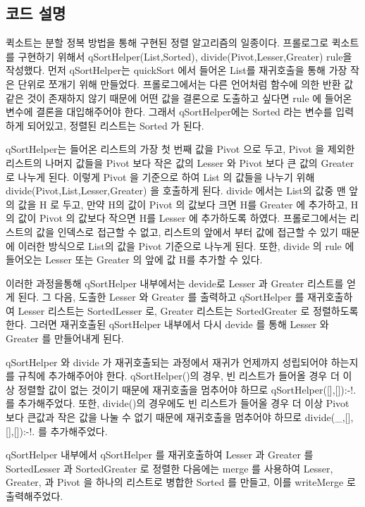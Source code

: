\documentclass{article}
\begin{document}
\subsection{코드 설명}
퀵소트는 분할 정복 방법을 통해 구현된 정렬 알고리즘의 일종이다. 프롤로그로 퀵소트를 구현하기
위해서 qSortHelper(List,Sorted), divide(Pivot,Lesser,Greater) rule을 작성했다.
먼저 qSortHelper는 quickSort 에서 들어온 List를 재귀호출을 통해 가장 작은 단위로 쪼개기
위해 만들었다. 프롤로그에서는 다른 언어처럼 함수에 의한 반환 값 같은 것이 존재하지 않기 때문에
어떤 값을 결론으로 도출하고 싶다면 rule 에 들어온 변수에 결론을 대입해주어야 한다. 그래서
qSortHelper에는 Sorted 라는 변수를 입력하게 되어있고, 정렬된 리스트는 Sorted 가 된다.

\vspace{3mm}
\noindent qSortHelper는 들어온 리스트의 가장 첫 번째 값을 Pivot 으로 두고, Pivot 을 제외한 리스트의
나머지 값들을 Pivot 보다 작은 값의 Lesser 와 Pivot 보다 큰 값의 Greater 로 나누게 된다.
이렇게 Pivot 을 기준으로 하여 List 의 값들을 나누기 위해 divide(Pivot,List,Lesser,Greater)
을 호출하게 된다. divide 에서는 List의 값중 맨 앞의 값을 H 로 두고, 만약 H의 값이 Pivot 의 값보다
크면 H를 Greater 에 추가하고, H의 값이 Pivot 의 값보다 작으면 H를 Lesser 에 추가하도록 하였다.
프롤로그에서는 리스트의 값을 인덱스로 접근할 수 없고, 리스트의 앞에서 부터 값에 접근할 수 있기 때문에
이러한 방식으로 List의 값을 Pivot 기준으로 나누게 된다. 또한, divide 의 rule 에 들어오는 Lesser
또는 Greater 의 앞에 값 H를 추가할 수 있다.

\vspace{3mm}
\noindent 이러한 과정을통해 qSortHelper 내부에서는 devide로 Lesser 과 Greater 리스트를 얻게 된다.
그 다음, 도출한 Lesser 와 Greater 를 출력하고 qSortHelper 를 재귀호출하여 Lesser 리스트는
SortedLesser 로, Greater 리스트는 SortedGreater 로 정렬하도록 한다. 그러면 재귀호출된
qSortHelper 내부에서 다시 devide 를 통해 Lesser 와 Greater 를 만들어내게 된다.

\vspace{3mm}
\noindent qSortHelper 와 divide 가 재귀호출되는 과정에서 재귀가 언제까지 성립되어야 하는지를
규칙에 추가해주어야 한다. qSortHelper()의 경우, 빈 리스트가 들어올 경우 더 이상
정렬할 값이 없는 것이기 때문에 재귀호출을 멈추어야 하므로 qSortHelper([],[]):-!. 를 추가해주었다.
또한, divide()의 경우에도 빈 리스트가 들어올 경우 더 이상 Pivot 보다 큰값과 작은 값을 나눌 수 없기
때문에 재귀호출을 멈추어야 하므로 divide(\_,[],[],[]):-!. 를 추가해주었다.

\vspace{3mm}
\noindent 
qSortHelper 내부에서 qSortHelper 를 재귀호출하여 Lesser 과 Greater 를 SortedLesser 과
SortedGreater 로 정렬한 다음에는 merge 를 사용하여 Lesser, Greater, 과 Pivot 을
하나의 리스트로 병합한 Sorted 를 만들고, 이를 writeMerge 로 출력해주었다.
\end{document}
